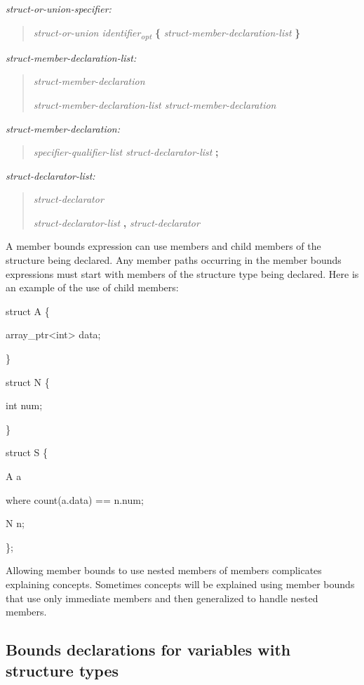 \documentclass[]{article}
\begin{document}
\emph{struct-or-union-specifier:}

\begin{quote}
\emph{struct-or-union identifier\textsubscript{opt}} \textbf{\{}
\emph{struct-member-declaration-list} \textbf{\}}
\end{quote}

\emph{struct-member-declaration-list:}

\begin{quote}
\emph{struct-member-declaration}

\emph{struct-member-declaration-list struct-member-declaration}
\end{quote}

\emph{struct-member-declaration:}

\begin{quote}
\emph{specifier-qualifier-list struct-declarator-list} \textbf{;}
\end{quote}

\emph{struct-declarator-list:}

\begin{quote}
\emph{struct-declarator}

\emph{struct-declarator-list} \textbf{,} \emph{struct-declarator}
\end{quote}

A member bounds expression can use members and child members of the
structure being declared. Any member paths occurring in the member
bounds expressions must start with members of the structure type being
declared. Here is an example of the use of child members:

struct A \{

array\_ptr\textless{}int\textgreater{} data;

\}

struct N \{

int num;

\}

struct S \{

A a

where count(a.data) == n.num;

N n;

\};

Allowing member bounds to use nested members of members complicates
explaining concepts. Sometimes concepts will be explained using member
bounds that use only immediate members and then generalized to handle
nested members.

\subsection{\texorpdfstring{\protect\hypertarget{ux5fToc420589198}{}{\protect\hypertarget{ux5fToc422906989}{}{\protect\hypertarget{ux5fToc424307704}{}{\protect\hypertarget{ux5fToc426641094}{}{\protect\hypertarget{ux5fToc435434976}{}{\protect\hypertarget{ux5fToc437460807}{}{\protect\hypertarget{ux5fToc440445488}{}{\protect\hypertarget{ux5fToc440449270}{}{\protect\hypertarget{ux5fToc440551920}{}{}}}}}}}}}Bounds
declarations for variables with structure
types}{Bounds declarations for variables with structure types}}\label{bounds-declarations-for-variables-with-structure-types}
\end{document}

